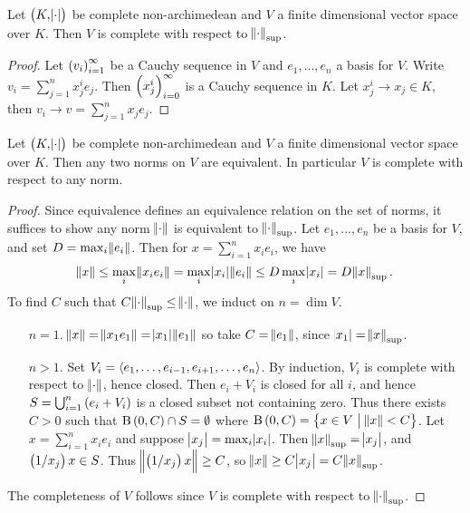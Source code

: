 \begin{proposition}
Let $ \br{K, \abs{\cdot}} $ be complete non-archimedean and $ V $ a finite dimensional vector space over $ K $. Then $ V $ is complete with respect to $ \norm{\cdot}_{\sup} $.
\end{proposition}

\begin{proof}
Let $ \br{v_i}_{i = 1}^\infty $ be a Cauchy sequence in $ V $ and $ e_1, \dots, e_n $ a basis for $ V $. Write $ v_i = \sum_{j = 1}^n x_j^ie_j $. Then $ \br{x_j^i}_{i = 0}^\infty $ is a Cauchy sequence in $ K $. Let $ x_j^i \to x_j \in K $, then $ v_i \to v = \sum_{j = 1}^n x_je_j $.
\end{proof}

\begin{theorem}
\label{thm:6.5}
Let $ \br{K, \abs{\cdot}} $ be complete non-archimedean and $ V $ a finite dimensional vector space over $ K $. Then any two norms on $ V $ are equivalent. In particular $ V $ is complete with respect to any norm.
\end{theorem}

\begin{proof}
Since equivalence defines an equivalence relation on the set of norms, it suffices to show any norm $ \norm{\cdot} $ is equivalent to $ \norm{\cdot}_{\sup} $. Let $ e_1, \dots, e_n $ be a basis for $ V $, and set $ D = \max_i \norm{e_i} $. Then for $ x = \sum_{i = 1}^n x_ie_i $, we have
$$ \norm{x} \le \max_i \norm{x_ie_i} = \max_i \abs{x_i}\norm{e_i} \le D\max_i \abs{x_i} = D\norm{x}_{\sup}. $$
To find $ C $ such that $ C\norm{\cdot}_{\sup} \le \norm{\cdot} $, we induct on $ n = \dim V $.
\begin{itemize}[leftmargin=0.5in]
\item[$ n = 1 $.] $ \norm{x} = \norm{x_1e_1} = \abs{x_1}\norm{e_1} $ so take $ C = \norm{e_1} $, since $ \abs{x_1} = \norm{x}_{\sup} $.
\item[$ n > 1 $.] Set $ V_i = \left\langle e_1, \dots, e_{i - 1}, e_{i + 1}, \dots, e_n \right\rangle $. By induction, $ V_i $ is complete with respect to $ \norm{\cdot} $, hence closed. Then $ e_i + V_i $ is closed for all $ i $, and hence $ S = \bigcup_{i = 1}^n \br{e_i + V_i} $ is a closed subset not containing zero. Thus there exists $ C > 0 $ such that $ \B\br{0, C} \cap S = \emptyset $ where $ \B\br{0, C} = \cbr{x \in V \st \norm{x} < C} $. Let $ x = \sum_{i = 1}^n x_ie_i $ and suppose $ \abs{x_j} = \max_i \abs{x_i} $. Then $ \norm{x}_{\sup} = \abs{x_j} $, and $ \br{1 / x_j}x \in S $. Thus $ \norm{\br{1 / x_j}x} \ge C $, so $ \norm{x} \ge C\abs{x_j} = C\norm{x}_{\sup} $.
\end{itemize}
The completeness of $ V $ follows since $ V $ is complete with respect to $ \norm{\cdot}_{\sup} $.
\end{proof}

